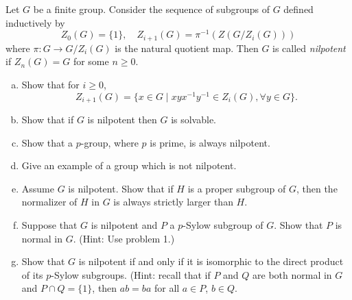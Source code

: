\documentclass{article}
\newcounter{Problem}
\newenvironment{Problem}{\begin{Exercise}[name={Problem},
                                          counter={Problem}]}
                        {\end{Exercise}}
\begin{document}
\begin{Problem}
Let $G$ be a finite group. Consider the sequence of subgroups of $G$
defined inductively by
$$
Z_0(G) = \{ 1 \}, \quad
Z_{i+1}(G) = \pi^{-1}(Z(G/Z_i(G)))
$$
where $\pi : G \to G / Z_i(G)$ is the natural quotient map. Then $G$
is called \emph{nilpotent} if $Z_n(G) = G$ for some $n \geq 0$.

\begin{enumerate}[(a)]
  \item{
    Show that for $i \geq 0$,
    $$
    Z_{i+1}(G) = \{ x \in G
                   \mid
                   xyx^{-1}y^{-1} \in Z_i(G), \forall y \in G
                \}.
    $$
  }
  \item{
    Show that if $G$ is nilpotent then $G$ is solvable.
  }
  \item{
    Show that a $p$-group, where $p$ is prime, is always nilpotent.
  }
  \item{
    Give an example of a group which is not nilpotent.
  }
  \item{
    Assume $G$ is nilpotent. Show that if $H$ is a proper subgroup of $G$, then
    the normalizer of $H$ in $G$ is always strictly larger than $H$.
  }
  \item{
    Suppose that $G$ is nilpotent and $P$ a $p$-Sylow subgroup of
    $G$. Show that $P$ is normal in $G$. (Hint: Use problem 1.)
  }
  \item{
    Show that $G$ is nilpotent if and only if it is isomorphic to the
    direct product of its $p$-Sylow subgroups. (Hint: recall that if
    $P$ and $Q$ are both normal in $G$ and $P \cap Q = \{ 1 \}$, then
    $ab = ba$ for all $a \in P$, $b \in Q$.
  }
\end{enumerate}
\end{Problem}
\end{document}
